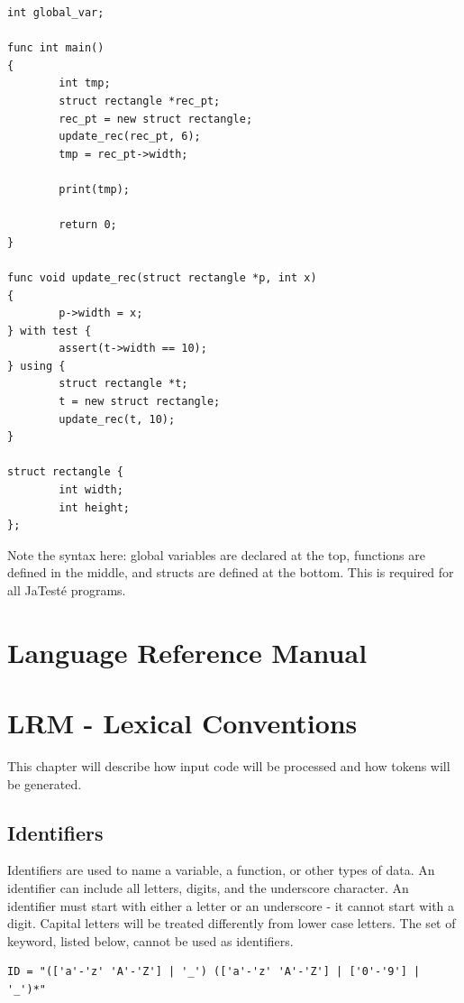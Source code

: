 \documentclass{article}
\begin{document}
\begin{enumerate}
\begin{lstlisting}
int global_var;

func int main()
{
        int tmp;
        struct rectangle *rec_pt;
        rec_pt = new struct rectangle;
        update_rec(rec_pt, 6);
        tmp = rec_pt->width;

        print(tmp);

        return 0;
}

func void update_rec(struct rectangle *p, int x)
{
        p->width = x;
} with test {
        assert(t->width == 10);
} using {
        struct rectangle *t;
        t = new struct rectangle;
        update_rec(t, 10);
}

struct rectangle {
        int width;
        int height;
};
\end{lstlisting}
Note the syntax here: global variables are declared at the top, functions are defined in the middle, and structs are defined at the bottom. This is required for all  JaTest\'{e} programs. 
\end{enumerate}

\newpage

\section*{Language Reference Manual}

\section{LRM - Lexical Conventions}
This chapter will describe how input code will be processed and how tokens will be generated.

\subsection{Identifiers}
Identifiers are used to name a variable, a function, or other types of data.  An identifier can include all letters, digits, and the underscore character.  An identifier must start with either a letter or an underscore - it cannot start with a digit.  Capital letters will be treated differently from lower case letters. The set of keyword, listed below, cannot be used as identifiers. 

\begin{Verbatim}[frame=single]
ID = "(['a'-'z' 'A'-'Z'] | '_') (['a'-'z' 'A'-'Z'] | ['0'-'9'] | '_')*"
\end{Verbatim}
\end{document}

